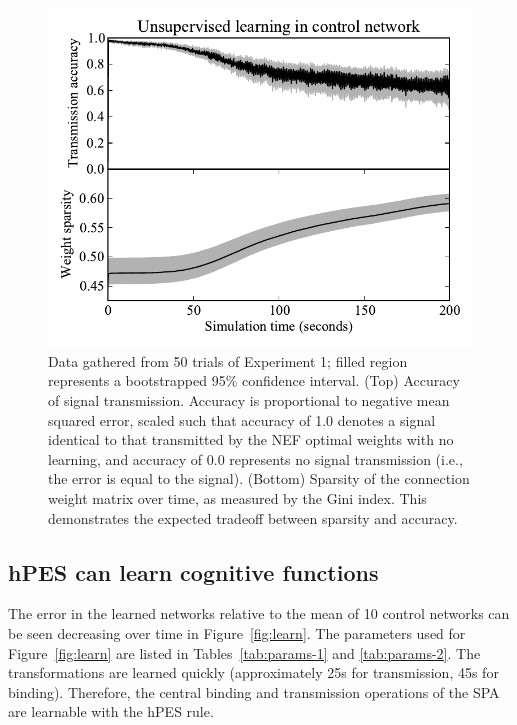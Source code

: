 \documentclass[10pt,letterpaper]{article}
\begin{document}
\begin{figure}[ht]
\begin{center}
\includegraphics[width=\columnwidth]{fig3-bcm}
\end{center}
\caption{Data gathered from 50 trials of Experiment 1;
  filled region represents a bootstrapped 95\% confidence interval.
  (Top) Accuracy of signal transmission.
  Accuracy is proportional to negative mean squared error,
  scaled such that accuracy of 1.0
  denotes a signal identical to that transmitted by the
  NEF optimal weights with no learning, and
  accuracy of 0.0 represents no signal transmission
  (i.e., the error is equal to the signal).
  (Bottom) Sparsity of the connection weight matrix over time,
  as measured by the Gini index. This demonstrates
  the expected tradeoff between sparsity and accuracy.}
\label{fig:bcm}
\end{figure}

\subsection{hPES can learn cognitive functions}

The error in the learned networks
relative to the mean of 10 control networks
can be seen decreasing over time in Figure~\ref{fig:learn}.
The parameters used for Figure~\ref{fig:learn}
are listed in Tables~\ref{tab:params-1} and \ref{tab:params-2}.
The transformations are learned quickly
(approximately 25s for transmission, 45s for binding).
Therefore, the central binding and transmission
operations of the SPA
are learnable with the hPES rule.
\end{document}
